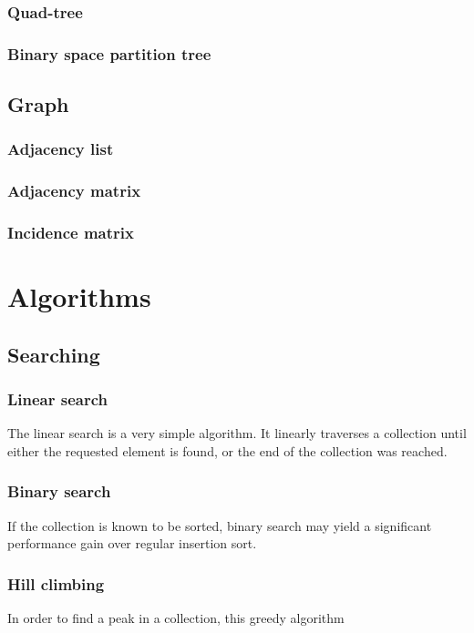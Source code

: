 \documentclass{article}
\begin{document}
\subsubsection{Quad-tree}
\subsubsection{Binary space partition tree}

\newpage

\subsection{Graph}

\subsubsection{Adjacency list}
\subsubsection{Adjacency matrix}
\subsubsection{Incidence matrix}

\newpage

\section{Algorithms}
\subsection{Searching}
\subsubsection{Linear search}
The linear search is a very simple algorithm. It linearly traverses a collection until either the requested
element is found, or the end of the collection was reached.

\subsubsection{Binary search}
If the collection is known to be sorted, binary search may yield a significant performance gain over regular insertion sort.

\subsubsection{Hill climbing}
In order to find a peak in a collection, this greedy algorithm 
\end{document}
